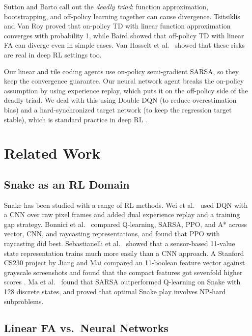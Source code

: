 \documentclass[letterpaper]{article}
\begin{document}
Sutton and Barto  call out the \emph{deadly triad}: function approximation, bootstrapping, and off-policy learning together can cause divergence. Tsitsiklis and Van Roy  proved that on-policy TD with linear function approximation converges with probability 1, while Baird  showed that off-policy TD with linear FA can diverge even in simple cases. Van Hasselt et al.\  showed that these risks are real in deep RL settings too.

Our linear and tile coding agents use on-policy semi-gradient SARSA, so they keep the convergence guarantee. Our neural network agent breaks the on-policy assumption by using experience replay, which puts it on the off-policy side of the deadly triad. We deal with this using Double DQN (to reduce overestimation bias) and a hard-synchronized target network (to keep the regression target stable), which is standard practice in deep RL \cite{mnih2015dqn,vanhasselt2016deep}.

\section{Related Work}

\subsection{Snake as an RL Domain}

Snake has been studied with a range of RL methods. Wei et al.\  used DQN with a CNN over raw pixel frames and added dual experience replay and a training gap strategy. Bonnici et al.\  compared Q-learning, SARSA, PPO, and A* across vector, CNN, and raycasting representations, and found that PPO with raycasting did best. Sebastianelli et al.\  showed that a sensor-based 11-value state representation trains much more easily than a CNN approach. A Stanford CS230 project by Jiang and Mai compared an 11-boolean feature vector against grayscale screenshots and found that the compact features got sevenfold higher scores \cite{jiang2021snakeai}. Ma et al.\  found that SARSA outperformed Q-learning on Snake with 128 discrete states, and proved that optimal Snake play involves NP-hard subproblems.

\subsection{Linear FA vs.\ Neural Networks}
\end{document}
